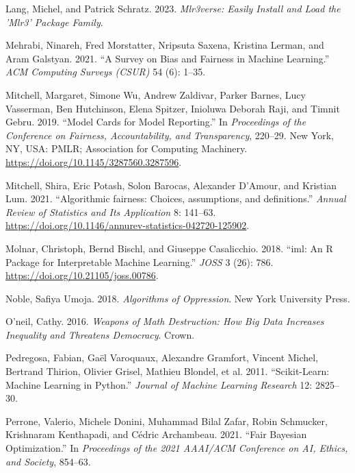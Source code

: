\begin{CSLReferences}{1}{0}
\leavevmode{}%
Lang, Michel, and Patrick Schratz. 2023. \emph{Mlr3verse: Easily Install and Load the 'Mlr3' Package Family}.

\leavevmode{}%
Mehrabi, Ninareh, Fred Morstatter, Nripsuta Saxena, Kristina Lerman, and Aram Galstyan. 2021. {``A Survey on Bias and Fairness in Machine Learning.''} \emph{ACM Computing Surveys (CSUR)} 54 (6): 1--35.

\leavevmode{}%
Mitchell, Margaret, Simone Wu, Andrew Zaldivar, Parker Barnes, Lucy Vasserman, Ben Hutchinson, Elena Spitzer, Inioluwa Deborah Raji, and Timnit Gebru. 2019. {``Model Cards for Model Reporting.''} In \emph{Proceedings of the Conference on Fairness, Accountability, and Transparency}, 220--29. New York, NY, USA: PMLR; Association for Computing Machinery. \url{https://doi.org/10.1145/3287560.3287596}.

\leavevmode{}%
Mitchell, Shira, Eric Potash, Solon Barocas, Alexander D'Amour, and Kristian Lum. 2021. {``{Algorithmic fairness: Choices, assumptions, and definitions}.''} \emph{Annual Review of Statistics and Its Application} 8: 141--63. \url{https://doi.org/10.1146/annurev-statistics-042720-125902}.

\leavevmode{}%
Molnar, Christoph, Bernd Bischl, and Giuseppe Casalicchio. 2018. {``{iml}: An {R} Package for Interpretable Machine Learning.''} \emph{JOSS} 3 (26): 786. \url{https://doi.org/10.21105/joss.00786}.

\leavevmode{}%
Noble, Safiya Umoja. 2018. \emph{Algorithms of Oppression}. New York University Press.

\leavevmode{}%
O'neil, Cathy. 2016. \emph{Weapons of Math Destruction: How Big Data Increases Inequality and Threatens Democracy}. Crown.

\leavevmode{}%
Pedregosa, Fabian, Gaël Varoquaux, Alexandre Gramfort, Vincent Michel, Bertrand Thirion, Olivier Grisel, Mathieu Blondel, et al. 2011. {``Scikit-Learn: Machine Learning in Python.''} \emph{Journal of Machine Learning Research} 12: 2825--30.

\leavevmode{}%
Perrone, Valerio, Michele Donini, Muhammad Bilal Zafar, Robin Schmucker, Krishnaram Kenthapadi, and Cédric Archambeau. 2021. {``{Fair Bayesian Optimization}.''} In \emph{Proceedings of the 2021 AAAI/ACM Conference on AI, Ethics, and Society}, 854--63.


\end{CSLReferences}
